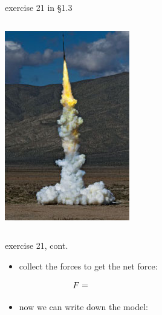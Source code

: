 \documentclass{beamer}
\begin{document}
\begin{frame}{exercise 21 in \S 1.3}
\begin{columns}
\begin{column}{0.3\textwidth}
\includegraphics[width=\textwidth]{exercise-21-1-3}
\end{column}
\end{columns}


\end{frame}


\begin{frame}{exercise 21, cont.}

\begin{itemize}
\item collect the forces to get the net force:

$$F = \hspace{70mm}$$
\vspace{10mm}

\item now we can write down the model:

\vspace{30mm}
\end{itemize}
\end{frame}
\end{document}
